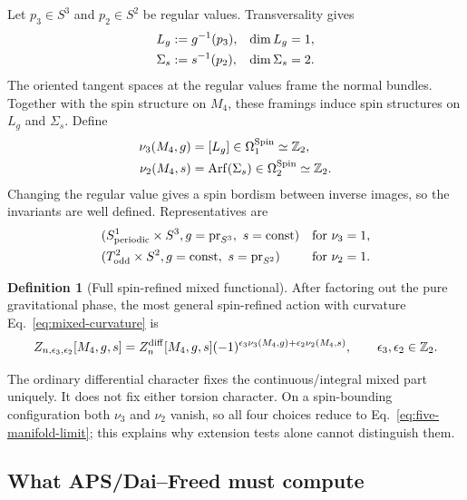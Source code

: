 \documentclass[11pt]{article}
\theoremstyle{definition}
\newtheorem{definition}[theorem]{Definition}
\theoremstyle{remark}
\newcommand{\ZZ}{\mathbb Z}
\newcommand{\Arf}{\operatorname{Arf}}
\begin{document}
Let \(p_3\in S^3\) and \(p_2\in S^2\) be regular values.  Transversality gives
\begin{align}
 L_g&:=g^{-1}(p_3),&\dim L_g&=1,\notag\\
 \Sigma_s&:=s^{-1}(p_2),&\dim\Sigma_s&=2.
 \label{eq:inverse-images}
\end{align}
The oriented tangent spaces at the regular values frame the normal bundles.
Together with the spin structure on \(M_4\), these framings induce spin
structures on \(L_g\) and \(\Sigma_s\).  Define
\begin{align}
 \nu_3(M_4,g)&=[L_g]\in\Omega_1^{\rm Spin}\simeq\ZZ_2,
 \label{eq:nu3}\\
 \nu_2(M_4,s)&=\Arf(\Sigma_s)\in
 \Omega_2^{\rm Spin}\simeq\ZZ_2.
 \label{eq:nu2}
\end{align}
Changing the regular value gives a spin bordism between inverse images, so
the invariants are well defined.  Representatives are
\begin{align}
 &(S^1_{\rm periodic}\times S^3,
 g=\operatorname{pr}_{S^3},\ s={\rm const})
 &&\text{for }\nu_3=1,\notag\\
 &(T^2_{\rm odd}\times S^2,
 g={\rm const},\ s=\operatorname{pr}_{S^2})
 &&\text{for }\nu_2=1.
 \label{eq:bordism-generators}
\end{align}

\begin{definition}[Full spin-refined mixed functional]
After factoring out the pure gravitational phase, the most general
spin-refined action with curvature Eq.~\eqref{eq:mixed-curvature} is
\begin{equation}
 Z_{n,\epsilon_3,\epsilon_2}[M_4,g,s]
 =Z_n^{\rm diff}[M_4,g,s]
 (-1)^{\epsilon_3\nu_3(M_4,g)+
       \epsilon_2\nu_2(M_4,s)},
 \qquad \epsilon_3,\epsilon_2\in\ZZ_2.
 \label{eq:full-spin-action}
\end{equation}
\end{definition}

The ordinary differential character fixes the continuous/integral mixed
part uniquely.  It does not fix either torsion character.  On a spin-bounding
configuration both \(\nu_3\) and \(\nu_2\) vanish, so all four choices reduce
to Eq.~\eqref{eq:five-manifold-limit}; this explains why extension tests alone
cannot distinguish them.

\subsection{What APS/Dai--Freed must compute}
\end{document}
